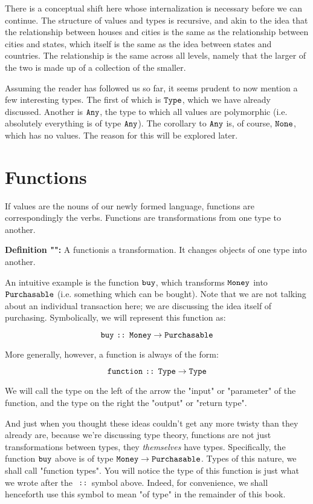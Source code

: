 \documentclass[12pt]{book}
\newcommand{\type}[1]{\ensuremath{\text{\texttt{#1}}}}
\newcommand{\func}[1]{\ensuremath{\text{\texttt{#1}}}}
\newcommand{\typeof}{\ensuremath{\text{ \texttt{::} }}}
\newcommand{\what}{}
\newcommand{\defn}[2]{\renewcommand{\what}{#1}\textbf{Definition "\titlecap{#1}":} #2}
\begin{document}
There is a conceptual shift here whose internalization is necessary before we can continue. The structure of values and
types is recursive, and akin to the idea that the relationship between houses and cities is the same as the relationship
between cities and states, which itself is the same as the idea between states and countries. The relationship is the
same across all levels, namely that the larger of the two is made up of a collection of the smaller.

Assuming the reader has followed us so far, it seems prudent to now mention a few interesting types. The first of which
is \type{Type}, which we have already discussed. Another is \type{Any}, the type to which all values are
polymorphic (i.e. absolutely everything is of type \type{Any}). The corollary to \type{Any} is, of course,
\type{None}, which has no values. The reason for this will be explored later.


\section{Functions}
If values are the nouns of our newly formed language, functions are correspondingly the verbs. Functions are
transformations from one type to another.

\defn{function}{A \what is a transformation. It changes objects of one type into another.}

An intuitive example is the function \func{buy}, which transforms \type{Money} into \type{Purchasable} (i.e.
something which can be bought). Note that we are not talking about an individual transaction here; we are discussing the
idea itself of purchasing. Symbolically, we will represent this function as:

$$ \func{buy} \typeof \type{Money} \to \type{Purchasable} $$

More generally, however, a function is always of the form:

$$ \func{function} \typeof \type{Type} \to \type{Type} $$

We will call the type on the left of the arrow the "input" or "parameter" of the function, and the type on the right the
"output" or "return type".

And just when you thought these ideas couldn't get any more twisty than they already are, because we're discussing type
theory, functions are not just transformations between types, they \textit{themselves} have types. Specifically, the
function \func{buy} above is of type $\type{Money} \to \type{Purchasable}$. Types of this nature, we shall call
"function types". You will notice the type of this function is just what we wrote after the \typeof symbol above.
Indeed, for convenience, we shall henceforth use this symbol to mean "of type" in the remainder of this
book.
\end{document}
